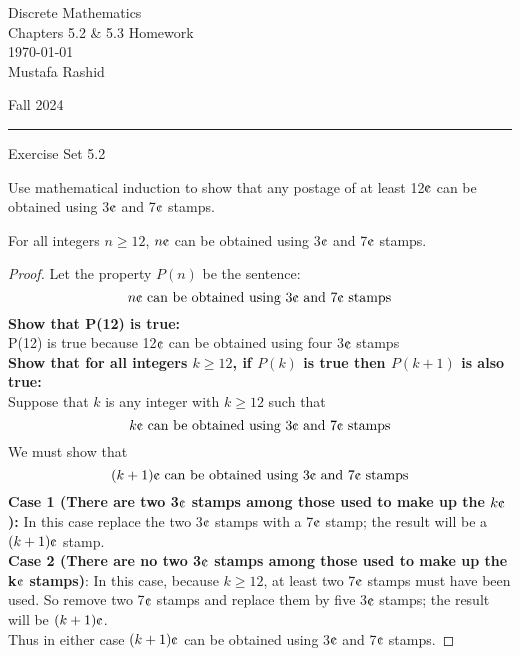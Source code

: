 \documentclass[12pt,letterpaper, onecolumn]{exam}
\begin{document}
	
	\begingroup  
	\noindent\LARGE Discrete Mathematics\\
	\noindent\LARGE Chapters 5.2 \& 5.3 Homework\\
	\noindent\large \today\\
	\noindent\large Mustafa Rashid\par
	\noindent\large Fall 2024\par
	\endgroup
	\rule{\textwidth}{0.4pt}
	\pointsdroppedatright
	\printanswers
	\renewcommand{\solutiontitle}{\noindent\textbf{Ans:}\enspace}  
	
	\centering\large Exercise Set 5.2\\
	\begin{questions}
		\setcounter{question}{1} \question  Use mathematical induction to show that any postage of at least 12$\mbox{\textcentoldstyle}$ can be obtained using 3$\mbox{\textcentoldstyle}$   and 7$\mbox{\textcentoldstyle}$  stamps.
		\begin{solution}
						For all integers $n\geq12$, $n\mbox{\textcentoldstyle}$ can be obtained using 3$\mbox{\textcentoldstyle}$   and 7$\mbox{\textcentoldstyle}$  stamps.
						\begin{proof}
							Let the property $P(n)$ be the sentence:
							$$n \mbox{\textcentoldstyle} \textrm{ can be obtained using } 3\mbox{\textcentoldstyle} \textrm{ and } 7\mbox{\textcentoldstyle} \textrm{ stamps}$$
							\textbf{Show that P(12) is true:}\\
							P(12) is true because 12$\mbox{\textcentoldstyle}$ can be obtained using four 3$\mbox{\textcentoldstyle}$ stamps\\
							\textbf{Show that for all integers $k\geq12$, if $P(k)$ is true then $P(k+1)$ is also true:}\\
							Suppose that $k$ is any integer with $k\geq12$ such that 
							$$k\mbox{\textcentoldstyle} \text{ can be obtained using 3}\mbox{\textcentoldstyle}  \text{ and } 7\mbox{\textcentoldstyle} \textrm{ stamps}$$
							We must show that
$$(k+1)\mbox{\textcentoldstyle} \text{ can be obtained using 3}\mbox{\textcentoldstyle}  \text{ and } 7\mbox{\textcentoldstyle} \textrm{ stamps}$$
\textbf{Case 1 (There are two 3$\mbox{\textcentoldstyle}$ stamps among those used to make up the $k\mbox{\textcentoldstyle}$):} In this case replace the two 3$\mbox{\textcentoldstyle}$ stamps with a 7$\mbox{\textcentoldstyle}$ stamp; the result will be a $(k+1)\mbox{\textcentoldstyle}$ stamp.\\
\textbf{Case 2 (There are no two 3$\mbox{\textcentoldstyle}$ stamps among those used to make up the k$\mbox{\textcentoldstyle}$ stamps)}: In this case, because $k\geq12$, at least two 7$\mbox{\textcentoldstyle}$ stamps must have been used. So remove two 7$\mbox{\textcentoldstyle}$ stamps and replace them by five 3$\mbox{\textcentoldstyle}$ stamps; the result will be $(k+1)\mbox{\textcentoldstyle}$.\\
Thus in either case $(k+1)\mbox{\textcentoldstyle}$ can be obtained using 3$\mbox{\textcentoldstyle}$  and 7$\mbox{\textcentoldstyle}$ stamps.
						\end{proof}
			

\end{solution}
\end{questions}
\end{document}
